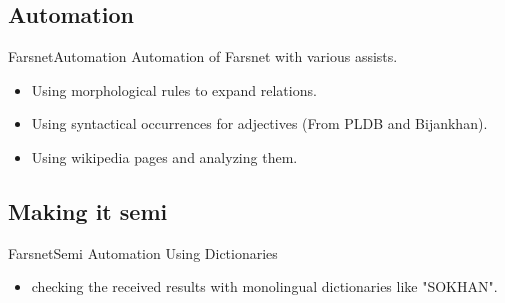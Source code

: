 \documentclass{beamer}
\begin{document}
\subsection{Automation}
\begin{frame}{Farsnet}{Automation}
	Automation of Farsnet with various assists.
	\begin{itemize}
		\item<1-> {
				Using morphological rules to expand relations.
			}
		\item<2-> {
				Using syntactical occurrences for adjectives (From PLDB and Bijankhan). 
			}
		\item<3->{
				Using wikipedia pages and analyzing them. 
			}
	\end{itemize}
\end{frame}

\subsection{Making it semi}
\begin{frame}{Farsnet}{Semi Automation}
	Using Dictionaries
	\begin{itemize}
		\item<1-> {
				checking the received results with monolingual dictionaries like "SOKHAN".
			}
	\end{itemize}
\end{frame}
\end{document}
